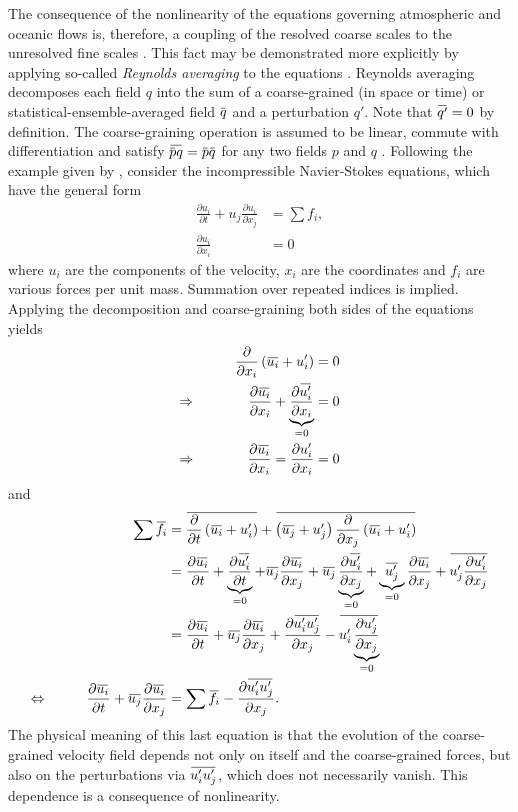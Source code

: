 \documentclass[titlepage]{article}
\numberwithin{equation}{section}
\newcommand{\pdiff}[2]{\frac{\partial #1}{\partial #2}}
\renewcommand{\bar}[1]{\mkern 1.5mu\overline{\mkern-1.5mu#1\mkern-1.5mu}\mkern 1.5mu}
\begin{document}
The consequence of the nonlinearity of the equations governing atmospheric and
oceanic flows is, therefore, a coupling of the resolved coarse scales to the
unresolved fine scales \parencite{mcfarlane2011}.
This fact may be demonstrated more explicitly by applying so-called
\emph{Reynolds averaging} to the equations \parencite{christensen2022}.
Reynolds averaging decomposes each field $q$ into the sum of a coarse-grained
(in space or time) or statistical-ensemble-averaged field $\bar{q}$ and a
perturbation $q'$. Note that $\bar{q'} = 0$ by definition. The coarse-graining
operation is assumed to be linear, commute with differentiation and satisfy
$\bar{\bar{p} q} = \bar{p} \bar{q}$ for any two fields $p$ and $q$
\parencite{monin2007}. Following the example given by
\textcite{christensen2022}, consider the incompressible Navier-Stokes
equations, which have the general form
\begin{align*}
    \pdiff{u_i}{t} + u_j \pdiff{u_i}{x_j} &= \sum f_i, \\
    \pdiff{u_i}{x_i} &= 0
\end{align*}
where $u_i$ are the components of the velocity, $x_i$ are the
coordinates and $f_i$ are various forces per unit mass. Summation over repeated
indices is implied. Applying the decomposition and coarse-graining both sides
of the equations yields
\begin{alignat*}{2}
    && \pdiff{}{x_i} \left( \bar{u_i} + u_i' \right) &= 0 \\
    \Rightarrow & \qquad &
        \pdiff{\bar{u_i}}{x_i}
        + \underbrace{\pdiff{\bar{u_i'}}{x_i}}_{=0} &= 0 \\
    \Rightarrow & \qquad &
        \pdiff{\bar{u_i}}{x_i} = \pdiff{u_i'}{x_i} &= 0
\end{alignat*}
and
\begin{alignat*}{2}
    && \sum \bar{f_i} &=
        \bar{\pdiff{}{t} \left( \bar{u_i} + u_i' \right)}
        + \bar{\left( \bar{u_j} + u_j' \right)
        \pdiff{}{x_j} \left( \bar{u_i} + u_i' \right)} \\
    &&&=
        \pdiff{\bar{u_i}}{t}
        + \underbrace{\pdiff{\bar{u_i'}}{t}}_{=0}
        + \bar{u_j} \pdiff{\bar{u_i}}{x_j}
        + \bar{u_j} \underbrace{\pdiff{\bar{u_i'}}{x_j}}_{=0}
        + \underbrace{\bar{u_j'}}_{=0} \pdiff{\bar{u_i}}{x_j}
        + \bar{u_j' \pdiff{u_i'}{x_j}} \\
    &&&=
        \pdiff{\bar{u_i}}{t} + \bar{u_j} \pdiff{\bar{u_i}}{x_j}
        + \pdiff{\bar{u_i' u_j'}}{x_j}
        - \bar{u_i' \underbrace{\pdiff{u_j'}{x_j}}_{=0}} \\
    \Leftrightarrow & \qquad &
        \pdiff{\bar{u_i}}{t} + \bar{u_j} \pdiff{\bar{u_i}}{x_j}
        &= \sum \bar{f_i} - \pdiff{\bar{u_i' u_j'}}{x_j}.
\end{alignat*}
The physical meaning of this last equation is that the evolution of the
coarse-grained velocity field depends not only on itself and the coarse-grained
forces, but also on the perturbations via $\bar{u_i' u_j'}$, which does not
necessarily vanish. This dependence is a consequence of nonlinearity.
\end{document}

